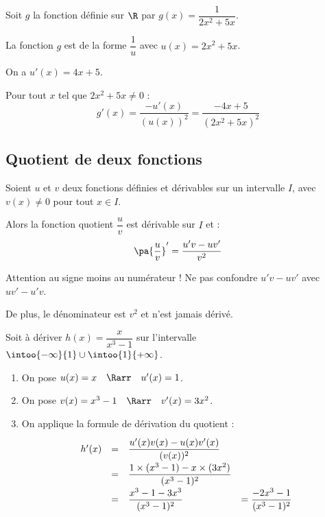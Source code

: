 \begin{ex}
	Soit $g$ la fonction définie sur $\R$ par $g(x) = \dfrac{1}{2x^2 + 5x}$.

	La fonction $g$ est de la forme $\dfrac{1}{u}$ avec $u(x) = 2x^2 + 5x$.

	On a $u'(x) = 4x + 5$.

	Pour tout $x$ tel que $2x^2 + 5x \neq 0$ :
	\[
		g'(x) = \dfrac{-u'(x)}{(u(x))^2} = \dfrac{-4x + 5}{(2x^2 + 5x)^2}
	\]
\end{ex}

\subsection{Quotient de deux fonctions}

\begin{prop}
	Soient $u$ et $v$ deux fonctions définies et dérivables sur un intervalle $I$, avec $v(x) \neq 0$ pour tout $x \in I$.

	Alors la fonction quotient $\dfrac{u}{v}$ est dérivable sur $I$ et :
	\[
		\pa{\dfrac{u}{v}}' = \dfrac{u'v - uv'}{v^2}
	\]
\end{prop}

\begin{erreur}
	Attention au signe moins au numérateur ! Ne pas confondre $u'v - uv'$ avec $uv' - u'v$.

	De plus, le dénominateur est $v^2$ et n'est jamais dérivé.
\end{erreur}

\begin{methode}
	Soit à dériver $h(x) = \dfrac{x}{x^3 - 1}$ sur l'intervalle $\intoo{-\infty}{1} \cup \intoo{1}{+\infty}$.

	\begin{enumerate}
		\item On pose $u(x) = x \quad\Rarr\quad u'(x) = 1$.
		\item On pose $v(x) = x^3 - 1 \quad\Rarr\quad v'(x) = 3x^2$.
		\item On applique la formule de dérivation du quotient :
		      \[
			      \def\arraystretch{2}
			      \begin{array}{rcll}
				      h'(x) & = & \dfrac{u'(x)v(x) - u(x)v'(x)}{(v(x))^2}                   &                                   \\
				            & = & \dfrac{1 \times (x^3 - 1) - x \times (3x^2)}{(x^3 - 1)^2} &                                   \\
				            & = & \dfrac{x^3 - 1 - 3x^3}{(x^3 - 1)^2}                       & =  \dfrac{-2x^3 - 1}{(x^3 - 1)^2}
			      \end{array}
		      \]
	\end{enumerate}
\end{methode}

